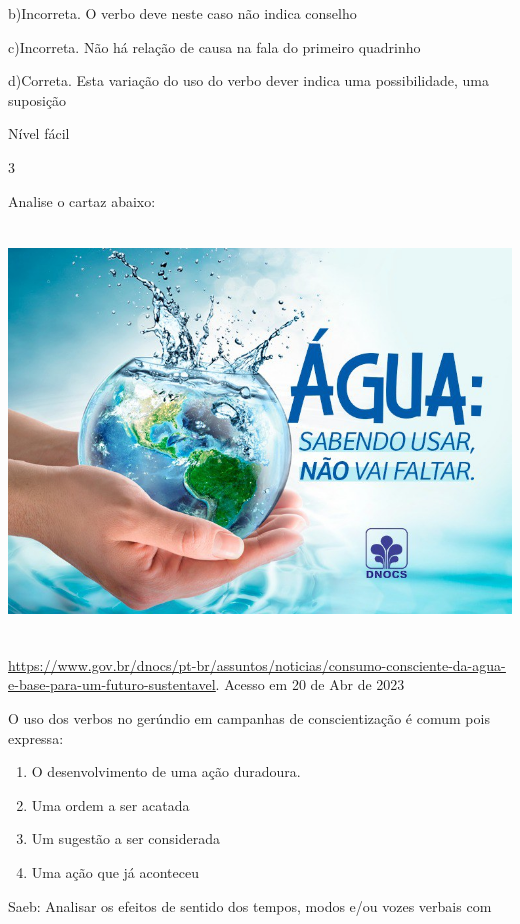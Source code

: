 {b)Incorreta. O verbo deve neste caso não indica conselho

c)Incorreta. Não há relação de causa na fala do primeiro quadrinho

d)Correta. Esta variação do uso do verbo dever indica uma possibilidade,
uma suposição

Nível fácil

\num{3}

Analise o cartaz abaixo:

\includegraphics[width=5.90551in,height=4.29167in]{./imgSAEB_7_POR/media/image13.png}

\href{https://www.gov.br/dnocs/pt-br/assuntos/noticias/consumo-consciente-da-agua-e-base-para-um-futuro-sustentavel}{\uline{https://www.gov.br/dnocs/pt-br/assuntos/noticias/consumo-consciente-da-agua-e-base-para-um-futuro-sustentavel}}.
Acesso em 20 de Abr de 2023

O uso dos verbos no gerúndio em campanhas de conscientização é comum
pois expressa:

\begin{enumerate}
\def\labelenumi{\alph{enumi})}
\item
  O desenvolvimento de uma ação duradoura.
\item
  Uma ordem a ser acatada
\item
  Um sugestão a ser considerada
\item
  Uma ação que já aconteceu
\end{enumerate}

Saeb: Analisar os efeitos de sentido dos tempos, modos e/ou vozes
verbais com

}
